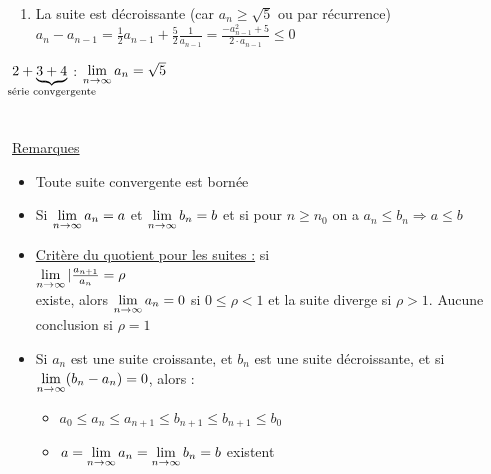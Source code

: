 \documentclass[12pt,a4paper]{article}
\begin{document}
{\begin{enumerate}
\begin{itemize}
\item $a_1 = 3 \geq \sqrt{5}$
\item $a_n = \frac{1}{2}(a_{n-1} + \frac{5}{<_{n-1}} = \frac{1}{2a_{n_1}}(a_{n-1}^2 + 5) = \frac{1}{2a_{n-1}}(a_{n-1} - \sqrt{5})^2 + \sqrt{5} \geq \sqrt{5} (P_n)$
\end{itemize}
\item La suite est décroissante (car $a_n \geq \sqrt{5}$ ou par récurrence)\\
$a_n - a_{n-1} = \frac{1}{2}a_{n-1} + \frac{5}{2} \frac{1}{a_{n-1}} = \frac{-a_{n-1}^2 + 5}{2\cdot a_{n-1}} \leq 0$\\
\end{enumerate}
$2+\underbrace{3+4}_{\mathclap{\text{série convgergente}}}$ : $\lim\limits_{n \to \infty} a_n = \sqrt{5}$ \\
\\
\\
\underline{Remarques}
\begin{itemize}
\item Toute suite convergente est bornée
\item Si $\lim\limits_{n \to \infty} a_n = a$ et $\lim\limits_{n \to \infty} b_n = b$ et si pour $n \geq n_0$ on a $a_n \leq b_n \Rightarrow a \leq b$
\item \underline{Critère du quotient pour les suites :} si\\
 $\lim\limits_{n \to \infty}|\frac{a_{n+1}}{a_n} = \rho$\\
 existe, alors $\lim\limits_{n \to \infty} a_n = 0$ si $0 \leq \rho < 1$ et la suite diverge si $\rho > 1$. Aucune conclusion si $\rho = 1$
 \item Si $a_n$ est une suite croissante, et $b_n$ est une suite décroissante, et si $\lim\limits_{n \to \infty}(b_n-a_n) = 0$, alors :
 \begin{itemize}
 \item $a_0 \leq a_n \leq a_{n+1} \leq b_{n+1} \leq b_{n+1}\leq b_0$
 \item $a = \lim\limits_{n \to \infty} a_n = \lim\limits_{n \to \infty} b_n = b$ existent
 \end{itemize}
\end{itemize}

}
\end{document}
